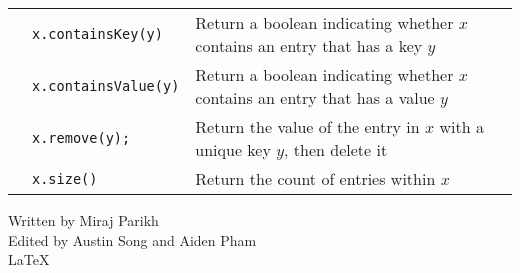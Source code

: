 \documentclass{article}
\begin{document}
\begin{center}
\begin{tabularx}{\textwidth}{llX}
                                       & \lstinline|x.containsKey(y)| & Return a boolean indicating whether \(x\) contains an entry that has a key \(y\)\\
                                       & \lstinline|x.containsValue(y)| & Return a boolean indicating whether \(x\) contains an entry that has a value \(y\)\\
                                       & \lstinline|x.remove(y);| & Return the value of the entry in \(x\) with a unique key \(y\), then delete it\\
                                       & \lstinline|x.size()| & Return the count of entries within \(x\)
\\\bottomrule\end{tabularx}\end{center}






\vfill\raggedleft
Written by Miraj Parikh\\
Edited by Austin Song and Aiden Pham\\
\oldpilcrowfive\LaTeX
\end{document}

